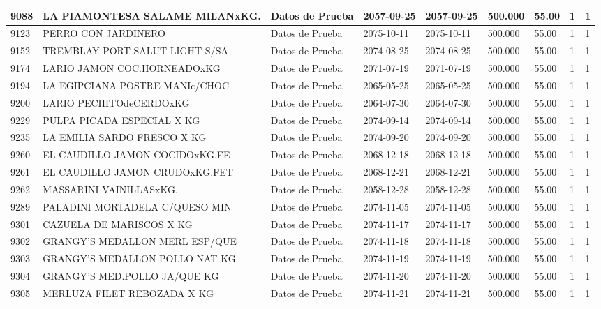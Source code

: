 \documentclass[a4paper,12pt]{article}
\begin{document}
\begin{landscape}
\begin{longtable}{|p{4cm}|p{2.5cm}|p{2.5cm}|p{1.8cm}|p{1.8cm}|p{1cm}|p{1cm}|p{3cm}|p{3cm}||}
9088 & LA PIAMONTESA SALAME MILANxKG. & Datos de Prueba & 2057-09-25 & 2057-09-25 & 500.000 & 55.00 & 1 & 1 \\ \hline 
9123 & PERRO CON  JARDINERO & Datos de Prueba & 2075-10-11 & 2075-10-11 & 500.000 & 55.00 & 1 & 1 \\ \hline 
9152 & TREMBLAY PORT SALUT LIGHT S/SA & Datos de Prueba & 2074-08-25 & 2074-08-25 & 500.000 & 55.00 & 1 & 1 \\ \hline 
9174 & LARIO JAMON COC.HORNEADOxKG & Datos de Prueba & 2071-07-19 & 2071-07-19 & 500.000 & 55.00 & 1 & 1 \\ \hline 
9194 & LA EGIPCIANA POSTRE MANIc/CHOC & Datos de Prueba & 2065-05-25 & 2065-05-25 & 500.000 & 55.00 & 1 & 1 \\ \hline 
9200 & LARIO PECHITOdeCERDOxKG & Datos de Prueba & 2064-07-30 & 2064-07-30 & 500.000 & 55.00 & 1 & 1 \\ \hline 
9229 & PULPA PICADA ESPECIAL X KG & Datos de Prueba & 2074-09-14 & 2074-09-14 & 500.000 & 55.00 & 1 & 1 \\ \hline 
9235 & LA EMILIA SARDO FRESCO X KG & Datos de Prueba & 2074-09-20 & 2074-09-20 & 500.000 & 55.00 & 1 & 1 \\ \hline 
9260 & EL CAUDILLO JAMON COCIDOxKG.FE & Datos de Prueba & 2068-12-18 & 2068-12-18 & 500.000 & 55.00 & 1 & 1 \\ \hline 
9261 & EL CAUDILLO JAMON CRUDOxKG.FET & Datos de Prueba & 2068-12-21 & 2068-12-21 & 500.000 & 55.00 & 1 & 1 \\ \hline 
9262 & MASSARINI VAINILLASxKG. & Datos de Prueba & 2058-12-28 & 2058-12-28 & 500.000 & 55.00 & 1 & 1 \\ \hline 
9289 & PALADINI MORTADELA C/QUESO MIN & Datos de Prueba & 2074-11-05 & 2074-11-05 & 500.000 & 55.00 & 1 & 1 \\ \hline 
9301 & CAZUELA DE MARISCOS X KG & Datos de Prueba & 2074-11-17 & 2074-11-17 & 500.000 & 55.00 & 1 & 1 \\ \hline 
9302 & GRANGY'S MEDALLON MERL ESP/QUE & Datos de Prueba & 2074-11-18 & 2074-11-18 & 500.000 & 55.00 & 1 & 1 \\ \hline 
9303 & GRANGY'S MEDALLON POLLO NAT KG & Datos de Prueba & 2074-11-19 & 2074-11-19 & 500.000 & 55.00 & 1 & 1 \\ \hline 
9304 & GRANGY'S MED.POLLO JA/QUE KG & Datos de Prueba & 2074-11-20 & 2074-11-20 & 500.000 & 55.00 & 1 & 1 \\ \hline 
9305 & MERLUZA FILET REBOZADA X KG & Datos de Prueba & 2074-11-21 & 2074-11-21 & 500.000 & 55.00 & 1 & 1 \\ \hline 

\end{longtable}
\end{landscape}
\end{document}
